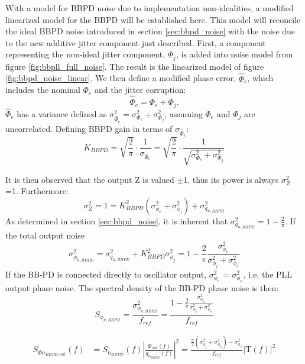 	With a model for BBPD noise due to implementation non-idealities, a modified linearized model for the BBPD will be established here. This model will reconcile the ideal BBPD noise introduced in section \ref{sec:bbpd_noise} with the noise due to the new additive jitter component just described. First, a component representing the non-ideal jitter component, $\Phi_j$, is added into noise model from figure \ref{fig:bbpll_full_noise}. The result is the linearized model of figure \ref{fig:bbpd_noise_linear}. We then define a modified phase error, $\hat{\Phi}_e$, which includes the nominal $\Phi_e$ and the jitter corruption:
	\begin{equation}
	\hat{\Phi}_e = \Phi_e + \Phi_j.
	\end{equation}
	$\hat{\Phi}_e$ has a variance defined as $\sigma_{\hat{\Phi}_e}^2 = \sigma_{\Phi_e}^2 + \sigma_{\Phi_j}^2$, assuming $\Phi_e$ and $\Phi_j$ are uncorrelated. Defining BBPD gain in terms of $\sigma_{\hat{\Phi}_e}$:
	\begin{equation}
		K_{BBPD} = \sqrt{\frac{2}{\pi}}\cdot\frac{1}{\sigma_{\hat{\Phi}_e}} = \sqrt{\frac{2}{\pi}}\cdot\frac{1}{\sqrt{\sigma_{\Phi_e}^2 + \sigma_{\Phi_j}^2}}
	\end{equation}

	 It is then observed that the output Z is valued $\pm$1, thus its power is always $\sigma_Z^2$=1. Furthermore:
	\begin{equation}
	 	\sigma^2_{Z} = 1 = K_{BBPD}^2(\sigma^2_{\phi_e} +\sigma^2_{\phi_j})  + \sigma^2_{q_{n,BBPD}}
	\end{equation}
	 As determined in section \ref{sec:bbpd_noise}, it is inherent that $\sigma^2_{q_{n,BBPD}} = 1 - \frac{2}{\pi}$. If the total output noise
			\begin{equation}
				\sigma^2_{\phi_{n,BBPD}} =  \sigma^2_{q_{n,BBPD}} + K_{BBPD}^2\sigma^2_{\phi_j} =  1 - \frac{2}{\pi}\frac{\sigma^2_{\phi_e}}{\sigma^2_{\phi_j} + \sigma^2_{\phi_e}}
			\end{equation}
	If the BB-PD is connected directly to oscillator output, $\sigma^2_{\phi_e}$ = $\sigma^2_{\phi_n}$, i.e. the PLL output phase noise. The spectral density of the BB-PD phase noise is then:
		\begin{equation}
			S_{\phi_{n,BBPD}} = \frac{\sigma^2_{\phi_{n,BBPD}}}{f_{ref}} =  \frac{1 - \frac{2}{\pi}\frac{\sigma^2_{\phi_n}}{\sigma^2_{\phi_j} + \sigma^2_{\phi_n}}}{f_{ref}}
		\end{equation}

		\begin{align}\label{eq:out_psd_bbpd_pll3}
			S_{\Phi n_{BBPD,out}}(f) &= S_{n_{BBPD}}(f)\left|\frac{\Phi_{out}(f)}{q_{n_{BBPD}}(f)}\right|^2 = \frac{\frac{\pi}{2}(\sigma^2_{\phi_j} + \sigma^2_{\phi_n})-\sigma^2_{\phi_n}}{f_{ref}}\left|\mathrm{T}(f)\right|^2
		\end{align}

